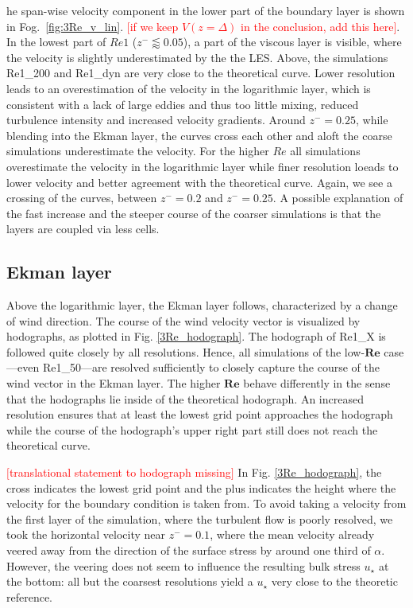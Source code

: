 \documentclass[a4paper,11pt]{article}
\newcommand{\todo}[1]{\textcolor{red}{$[$#1$]$}}
\newcommand{\RE}{\mathbf{Re}}
\begin{document}
he span-wise velocity component in the lower part of the boundary layer is shown in Fog.~\ref{fig:3Re_v_lin}. \todo{if we keep $V(z=\Delta)$ in the conclusion, add this here}. In the lowest part of $Re1$ ($z^-\lessapprox 0.05$), a part of the viscous layer is visible, where the velocity is slightly underestimated by the the LES. Above, the simulations Re1\_200 and Re1\_dyn are very close to the theoretical curve. Lower resolution leads to an overestimation of the velocity in the logarithmic layer, which is consistent with a lack of large eddies and thus too little mixing, reduced turbulence intensity and increased velocity gradients. Around $z^-=0.25$, while blending into the Ekman layer, the curves cross each other and aloft the coarse simulations underestimate the velocity. For the higher $Re$ all simulations overestimate the velocity in the logarithmic layer while finer resolution loeads to lower velocity and better agreement with the theoretical curve. Again, we see a crossing of the curves, between $z^-=0.2$ and $z^-=0.25$. A possible explanation of the fast increase and the steeper course of the coarser simulations is that the layers are coupled via less cells.

\subsection{Ekman layer}

Above the logarithmic layer, the Ekman layer follows, characterized by a change of wind direction. The course of the wind velocity vector is visualized by hodographs, as plotted in Fig. \ref{3Re_hodograph}. The hodograph of Re1\_X is followed quite closely by all resolutions. Hence, all simulations of the low-$\RE$ case---even Re1\_50---are resolved sufficiently to closely capture the course of the wind vector in the Ekman layer. The higher $\RE$ behave differently in the sense that the hodographs lie inside of the theoretical hodograph. An increased resolution ensures that at least the lowest grid point approaches the hodograph while the course of the hodograph's upper right part still does not reach the theoretical curve. 

\todo{translational statement to hodograph missing} In Fig. \ref{3Re_hodograph}, the cross indicates the lowest grid point and the plus indicates the height where the velocity for the boundary condition is taken from. To avoid taking a velocity from the first layer of the simulation, where the turbulent flow is poorly resolved, we took the horizontal velocity near $z^-=0.1$, where the mean velocity already veered away from the direction of the surface stress by around one third of $\alpha$. However, the veering does not seem to influence the resulting bulk stress $u_\star$ at the bottom: all but the coarsest resolutions yield a $u_\star$ very close to the theoretic reference.
\end{document}
